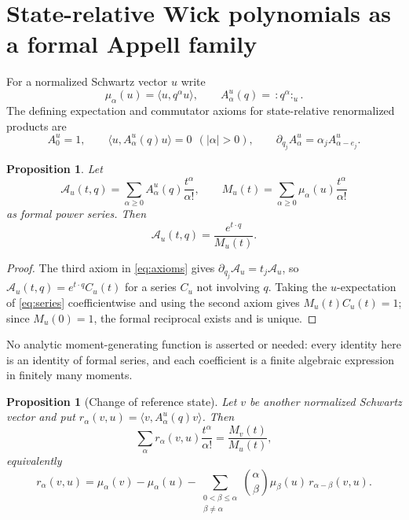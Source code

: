 \documentclass[11pt,reqno]{amsart}
\theoremstyle{plain}
\newtheorem{proposition}[theorem]{Proposition}
\theoremstyle{definition}
\theoremstyle{remark}
\numberwithin{equation}{section}
\begin{document}
\section{State-relative Wick polynomials as a formal Appell family}
\label{sec:appell}

For a normalized Schwartz vector $u$ write
\begin{equation}
  \label{eq:moments}
  \mu_\alpha(u)=\langle u,q^\alpha u\rangle,
  \qquad
  A_\alpha^u(q)=\,:q^\alpha:_u .
\end{equation}
The defining expectation and commutator axioms for state-relative
renormalized products \cite{BaezZhou1992} are
\begin{equation}
  \label{eq:axioms}
  A_0^u=1,
  \qquad
  \langle u,A_\alpha^u(q)u\rangle=0\ \ (|\alpha|>0),
  \qquad
  \partial_{q_j}A_\alpha^u=\alpha_jA_{\alpha-e_j}^u .
\end{equation}

\begin{proposition}
  \label{prop:generating}
  Let
  \begin{equation}
    \label{eq:series}
    \mathcal A_u(t,q)=\sum_{\alpha\ge0}A_\alpha^u(q)\frac{t^\alpha}{\alpha!},
    \qquad
    M_u(t)=\sum_{\alpha\ge0}\mu_\alpha(u)\frac{t^\alpha}{\alpha!}
  \end{equation}
  as formal power series. Then
  \begin{equation}
    \label{eq:appell}
    \mathcal A_u(t,q)=\frac{e^{t\cdot q}}{M_u(t)} .
  \end{equation}
\end{proposition}

\begin{proof}
  The third axiom in \eqref{eq:axioms} gives
  $\partial_{q_j}\mathcal A_u=t_j\mathcal A_u$, so
  $\mathcal A_u(t,q)=e^{t\cdot q}C_u(t)$ for a series $C_u$ not involving
  $q$. Taking the $u$-expectation of \eqref{eq:series} coefficientwise and
  using the second axiom gives $M_u(t)C_u(t)=1$; since $M_u(0)=1$, the
  formal reciprocal exists and is unique.
\end{proof}

No analytic moment-generating function is asserted or needed: every
identity here is an identity of formal series, and each coefficient is a
finite algebraic expression in finitely many moments.

\begin{proposition}[Change of reference state]
  \label{prop:change}
  Let $v$ be another normalized Schwartz vector and put
  $r_\alpha(v,u)=\langle v,A_\alpha^u(q)v\rangle$. Then
  \begin{equation}
    \label{eq:change}
    \sum_\alpha r_\alpha(v,u)\frac{t^\alpha}{\alpha!}
    =\frac{M_v(t)}{M_u(t)},
  \end{equation}
  equivalently
  \begin{equation}
    \label{eq:recurrence}
    r_\alpha(v,u)=\mu_\alpha(v)-\mu_\alpha(u)
      -\sum_{\substack{0<\beta\le\alpha\\ \beta\ne\alpha}}
        \binom{\alpha}{\beta}\mu_\beta(u)\,r_{\alpha-\beta}(v,u).
  \end{equation}
\end{proposition}
\end{document}
